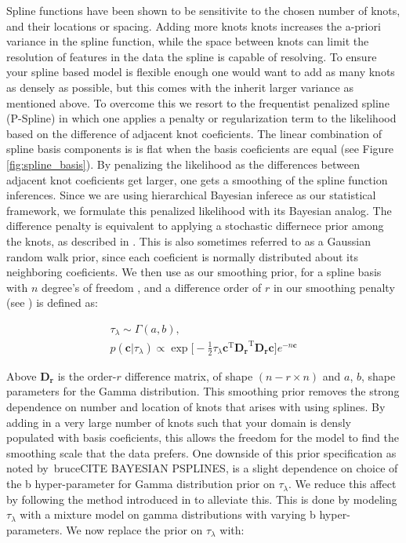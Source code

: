 Spline functions have been shown to be sensitivite to the chosen number of knots, and their locations or spacing. 
Adding more knots knots increases the a-priori variance in the spline function, while the space between knots can limit the 
resolution of features in the data the spline is capable of resolving. To ensure your spline based model is flexible enough 
one would want to add as many knots as densely as possible, but this comes with the inherit larger variance as mentioned above. 
To overcome this we resort to the frequentist penalized spline (P-Spline) in which one applies a penalty or regularization term 
to the likelihood based on the difference of adjacent knot coeficients. The linear combination of spline basis components is 
is flat when the basis coeficients are equal (see Figure \ref{fig:spline_basis}). By penalizing the likelihood as the differences between adjacent
knot coeficients get larger, one gets a smoothing of the spline function inferences. Since we are using hierarchical Bayesian inferece as our 
statistical framework, we formulate this penalized likelihood with its Bayesian analog. The difference penalty is equivalent to applying a stochastic 
differnece prior among the knots, as described in . This is also sometimes referred to as a Gaussian random walk prior, since
each coeficient is normally distributed about its neighboring coeficients. We then use as our smoothing prior, for a spline basis with $n$ degree's of freedom
, and a difference order of $r$ in our smoothing penalty (see ) is defined as:

\begin{eqnarray}
\tau_\lambda \sim \Gamma(a, b), \\
p(\bm{c} | \tau_\lambda) \propto \exp \big[ -\frac{1}{2} \tau_\lambda \bm{c}^{\mathrm{T}} \bm{D_r}^{\mathrm{T}} \bm{D_r} \bm{c}  \big] e^{-n\bm{c}}
\end{eqnarray}

\noindent Above $\bm{D_r}$ is the order-$r$ difference matrix, of shape $(n-r \times n)$ and $a$, $b$, shape parameters for the Gamma distribution. 
This smoothing prior removes the strong dependence on number and location of knots that arises with using splines. By adding in a very large number 
of knots such that your domain is densly populated with basis coeficients, this allows the freedom for the model to find the smoothing 
scale that the data prefers. One downside of this prior specification as noted by\ bruce{CITE BAYESIAN PSPLINES}, is a slight dependence on choice 
of the b hyper-parameter for Gamma distribution prior on $\tau_\lambda$. We reduce this affect by following the method introduced in  
to alleviate this. This is done by modeling $\tau_\lambda$ with a mixture model on gamma distributions with varying b hyper-parameters. 
We now replace the prior on $\tau_\lambda$ with:

